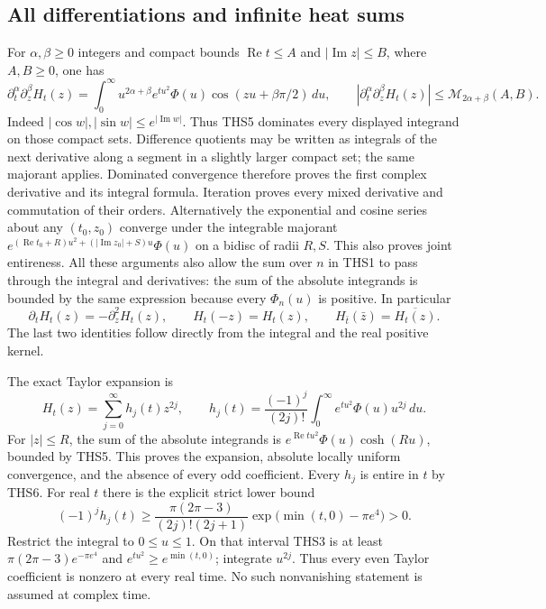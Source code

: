 \documentclass[11pt]{article}
\theoremstyle{definition}
\begin{document}
\subsection{All differentiations and infinite heat sums}

For $\alpha,\beta\ge0$ integers and compact bounds
$\operatorname{Re}t\le A$ and $|\operatorname{Im}z|\le B$,
where $A,B\ge0$, one has
\begin{equation}\tag{THS6}
 \partial_t^\alpha\partial_z^\beta H_t(z)
  =\int_0^\infty u^{2\alpha+\beta}e^{tu^2}\Phi(u)
                      \cos(zu+\beta\pi/2)\,du,
 \qquad
 |\partial_t^\alpha\partial_z^\beta H_t(z)|
     \le\mathcal M_{2\alpha+\beta}(A,B).
\end{equation}
Indeed $|\cos w|,|\sin w|\le e^{|\operatorname{Im}w|}$.
Thus THS5 dominates every displayed integrand on those compact
sets. Difference quotients may be written as integrals of the
next derivative along a segment in a slightly larger compact
set; the same majorant applies. Dominated convergence therefore
proves the first complex derivative and its integral formula.
Iteration proves every mixed derivative and commutation of their
orders. Alternatively the exponential and cosine series about
any $(t_0,z_0)$ converge under the integrable majorant
$e^{(\operatorname{Re}t_0+R)u^2+(|\operatorname{Im}z_0|+S)u}
\Phi(u)$ on a bidisc of radii $R,S$. This also proves joint
entireness. All these arguments also allow the sum over $n$ in
THS1 to pass through the integral and derivatives: the sum of
the absolute integrands is bounded by the same expression
because every $\Phi_n(u)$ is positive. In particular
\begin{equation}\tag{THS7}
 \partial_tH_t(z)=-\partial_z^2H_t(z),\qquad
 H_t(-z)=H_t(z),\qquad
 H_{\bar t}(\bar z)=\overline{H_t(z)}.
\end{equation}
The last two identities follow directly from the integral and
the real positive kernel.

The exact Taylor expansion is
\begin{equation}\tag{THS8}
 H_t(z)=\sum_{j=0}^{\infty}h_j(t)z^{2j},\qquad
 h_j(t)=\frac{(-1)^j}{(2j)!}
          \int_0^\infty e^{tu^2}\Phi(u)u^{2j}\,du.
\end{equation}
For $|z|\le R$, the sum of the absolute integrands is
$e^{\operatorname{Re}t u^2}\Phi(u)\cosh(Ru)$, bounded by
THS5. This proves the expansion, absolute locally uniform
convergence, and the absence of every odd coefficient.
Every $h_j$ is entire in $t$ by THS6. For real $t$ there is the
explicit strict lower bound
\begin{equation}\tag{THS9}
 (-1)^jh_j(t)\ge
 \frac{\pi(2\pi-3)}{(2j)!(2j+1)}
          \exp\bigl(\min(t,0)-\pi e^4\bigr)>0.
\end{equation}
Restrict the integral to $0\le u\le1$. On that interval THS3
is at least $\pi(2\pi-3)e^{-\pi e^4}$ and
$e^{tu^2}\ge e^{\min(t,0)}$; integrate $u^{2j}$.
Thus every even Taylor coefficient is nonzero at every real
time. No such nonvanishing statement is assumed at complex time.
\end{document}
